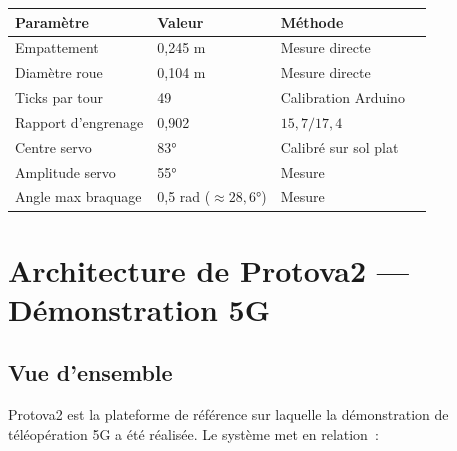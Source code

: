 \documentclass[a4paper,11pt]{article}
\begin{document}
\begin{center}
\begin{tabular}{llll}
\toprule
\textbf{Paramètre} & \textbf{Valeur} & \textbf{Méthode} \\
\midrule
Empattement               & 0,245 m  & Mesure directe \\
Diamètre roue             & 0,104 m  & Mesure directe \\
Ticks par tour            & 49       & Calibration Arduino \\
Rapport d'engrenage       & 0,902    & $15{,}7 / 17{,}4$ \\
Centre servo              & 83°      & Calibré sur sol plat \\
Amplitude servo           & 55°      & Mesure \\
Angle max braquage        & 0,5 rad (${\approx}28{,}6°$) & Mesure \\
\bottomrule
\end{tabular}
\end{center}


\newpage
\section{Architecture de Protova2 — Démonstration 5G}

\subsection{Vue d'ensemble}

Protova2 est la plateforme de référence sur laquelle la démonstration de
téléopération 5G a été réalisée. Le système met en relation~:
\end{document}
